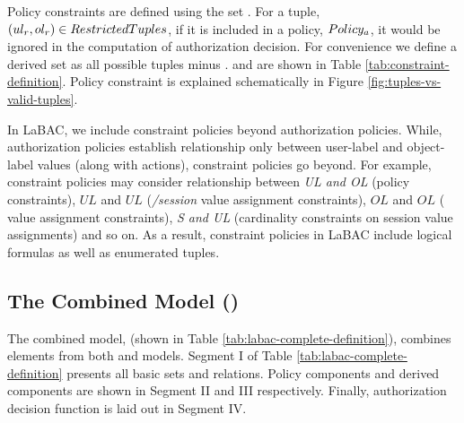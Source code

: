 	


	Policy constraints are defined using the set \textit{\restrictedTuples}.  For a tuple, $(ul_r,ol_r) \in RestrictedTuples$, if it is included in a policy, $Policy_a$, it would be ignored in the computation of authorization decision. For convenience we define a derived set \textit{\policyBound} as all possible tuples minus \textit{\restrictedTuples}. \textit{\restrictedTuples} and \textit{\policyBound} are shown in Table \ref{tab:constraint-definition}. Policy constraint is explained schematically in Figure \ref{fig:tuples-vs-valid-tuples}.
	
	In LaBAC, we include constraint policies beyond authorization policies. While, authorization policies establish relationship only between user-label and object-label values (along with actions), constraint policies go beyond. For example, constraint policies may consider relationship between \textit{UL and OL} (policy constraints), $UL$ and $UL$ (\textit{\uLabel/session} value assignment constraints), $OL$ and $OL$ (\textit{\oLabel} value assignment constraints), \textit{S and UL} (cardinality constraints on session value assignments) and so on.  As a result, constraint policies in LaBAC include logical formulas as well as enumerated tuples.
	
	
	
	
	\subsection{The Combined Model (\labacOneOneOne{})}
	
	The combined model, \labacOneOneOne{} (shown in Table \ref{tab:labac-complete-definition}), combines elements from both \hlabac{} and \consLabac{} models.  Segment I of Table \ref{tab:labac-complete-definition} presents all basic sets and relations. Policy components and derived components are shown in Segment II and  III respectively. Finally, authorization decision function is laid out in Segment IV.
	
	

	

	
	
